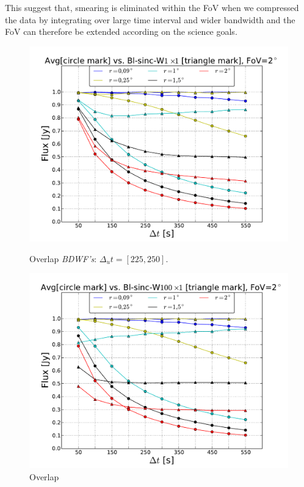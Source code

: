\documentclass[useAMS,usenatbib]{mn2e}
\begin{document}
This suggest that, smearing is eliminated within the FoV when we compressed the data by integrating over large time interval and wider 
bandwidth and the FoV can therefore be extended according on the science goals.
\begin{figure}
  \centering
\begin{minipage}{0.45\linewidth}\includegraphics[width=1.\textwidth]{./Figures/max-integ-time-sinc-w1x1fov2.pdf}\caption{
Overlap 
		\textit{BDWF's}: $\Delta_u t= [225, 250]$.}\label{ fig:fig_3a}\end{minipage}
\begin{minipage}{0.45\linewidth}\includegraphics[width=1.\textwidth]{./Figures/max-integ-time-sinc-w100x1fov2.pdf}\caption{Overlap 
}
\end{minipage}
\end{figure}
\end{document}
